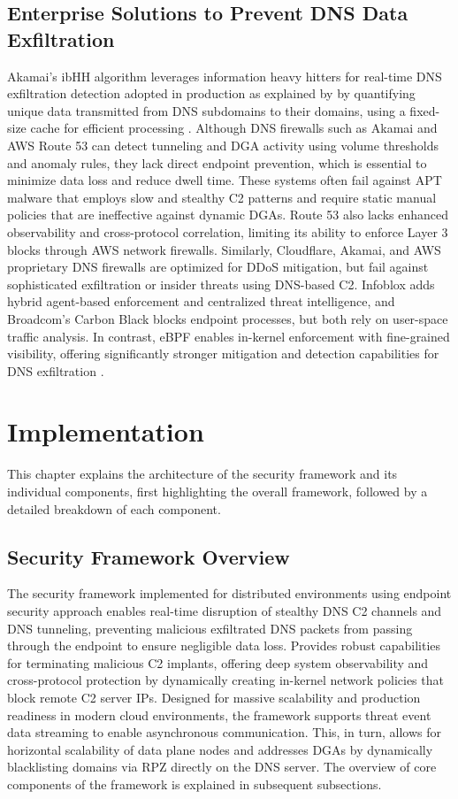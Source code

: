 \documentclass [11pt, proquest] {uwthesis}[2020/02/24]
\begin{document}
\section{Enterprise Solutions to Prevent DNS Data Exfiltration}
Akamai’s ibHH algorithm leverages information heavy hitters for real-time DNS exfiltration detection adopted in production as explained by \citeauthor{ozery2023information} by quantifying unique data transmitted from DNS subdomains to their domains, using a fixed-size cache for efficient processing \cite{ozery2023information}. Although DNS firewalls such as Akamai and AWS Route 53 can detect tunneling and DGA activity using volume thresholds and anomaly rules, they lack direct endpoint prevention, which is essential to minimize data loss and reduce dwell time. These systems often fail against APT malware that employs slow and stealthy C2 patterns and require static manual policies that are ineffective against dynamic DGAs. 
Route 53 also lacks enhanced observability and cross-protocol correlation, limiting its ability to enforce Layer 3 blocks through AWS network firewalls. Similarly, Cloudflare, Akamai, and AWS proprietary DNS firewalls are optimized for DDoS mitigation, but fail against sophisticated exfiltration or insider threats using DNS-based C2. Infoblox adds hybrid agent-based enforcement and centralized threat intelligence, and Broadcom’s Carbon Black blocks endpoint processes, but both rely on user-space traffic analysis. In contrast, eBPF enables in-kernel enforcement with fine-grained visibility, offering significantly stronger mitigation and detection capabilities for DNS exfiltration \cite{ahmed2019monitoring}.


\chapter{Implementation}
This chapter explains the architecture of the security framework and its individual components, first highlighting the overall framework, followed by a detailed breakdown of each component.
\section{Security Framework Overview}
The security framework implemented for distributed environments using endpoint security approach enables real-time disruption of stealthy DNS C2 channels and DNS tunneling, preventing malicious exfiltrated DNS packets from passing through the endpoint to ensure negligible data loss. Provides robust capabilities for terminating malicious C2 implants, offering deep system observability and cross-protocol protection by dynamically creating in-kernel network policies that block remote C2 server IPs. Designed for massive scalability and production readiness in modern cloud environments, the framework supports threat event data streaming to enable asynchronous communication. This, in turn, allows for horizontal scalability of data plane nodes and addresses DGAs by dynamically blacklisting domains via RPZ directly on the DNS server. The overview of core components of the framework is explained in subsequent subsections. 
\end{document}
